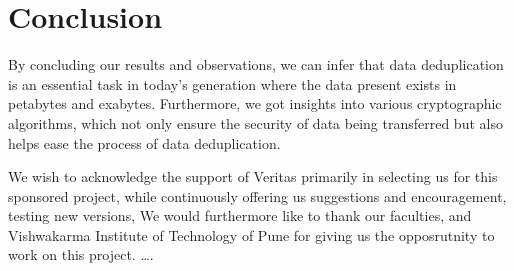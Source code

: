 \documentclass[%
 aip,
cp,  %
 amsmath,amssymb,%
 reprint,%
]{revtex4-2}
\begin{document}
\section{Conclusion}

By concluding our results and observations, we can infer that data deduplication is an essential task in today’s generation where the data present exists in petabytes and exabytes. Furthermore, we got insights into various cryptographic algorithms, which not only ensure the security of data being transferred but also helps ease the process of data deduplication.

\begin{acknowledgments}
We wish to acknowledge the support of Veritas primarily in selecting us for this sponsored project, while continuously offering us suggestions and encouragement, testing new versions, We would furthermore like to thank our faculties, and Vishwakarma Institute of Technology of Pune for giving us the opposrutnity to work on this project.
\dots.
\end{acknowledgments}

\nocite{*}
\end{document}
